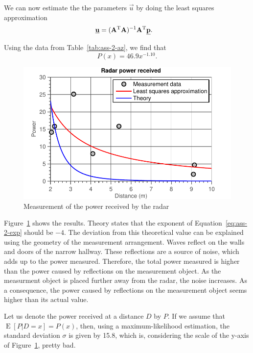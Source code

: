 \documentclass[11pt,titlepage]{report}
\begin{document}
We can now estimate the the parameters $\vec{u}$ by doing the least squares approximation
\begin{align}
	\mathbf{\underline{u}} &= (\mathbf{A}^{\text T} \mathbf{A})^{-1} \mathbf{A}^{\text T} \mathbf{\underline{p}}.
\end{align}

Using the data from Table~\ref{tab:ass-2-az}, we find that
\begin{equation} \label{eq:ass-2-exp}
	P(x) = 46.9 x^{-1.10}.
\end{equation}

\begin{figure}[H]
	\begin{center}
		\includegraphics[width=.8\linewidth]{resource/fit.pdf}
	\end{center}
	\caption{Measurement of the power received by the radar}
	\label{fig:ass-2-power}
\end{figure}

Figure~\ref{fig:ass-2-power} shows the results. Theory states that the exponent of Equation~\ref{eq:ass-2-exp} should be $-4$. The deviation from this theoretical value can be explained using the geometry of the measurement arrangement. Waves reflect on the walls and doors of the narrow hallway. These reflections are a source of noise, which adds up to the power measured. Therefore, the total power measured is higher than the power caused by reflections on the measurement object. As the measurment object is placed further away from the radar, the noise increases. As a consequence, the power caused by reflections on the measurement object seems higher than its actual value.

Let us denote the power received at a distance $D$ by $P$. If we assume that $\operatorname{E}[P|D=x]=P(x)$, then, using a maximum-likelihood estimation, the standard deviation $\sigma$ is given by \num{15.8}, which is, considering the scale of the y-axis of Figure~\ref{fig:ass-2-power}, pretty bad.
\end{document}
